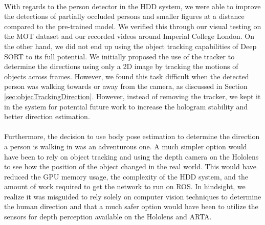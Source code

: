 \paragraph{}With regards to the person detector in the HDD system, we were able to improve the detections of partially occluded persons and smaller figures at a distance compared to the pre-trained model. We verified this through our visual testing on the MOT dataset and our recorded videos around Imperial College London. On the other hand, we did not end up using the object tracking capabilities of Deep SORT to its full potential. We initially proposed the use of the tracker to determine the directions using only a 2D image by tracking the motions of objects across frames. However, we found this task difficult when the detected person was walking towards or away from the camera, as discussed in Section \ref{sec:objecTrackingDirection}. However, instead of removing the tracker, we kept it in the system for potential future work to increase the hologram stability and better direction estimation.

\paragraph{}Furthermore, the decision to use body pose estimation to determine the direction a person is walking in was an adventurous one. A much simpler option would have been to rely on object tracking and using the depth camera on the Hololens to see how the position of the object changed in the real world. This would have reduced the GPU memory usage, the complexity of the HDD system, and the amount of work required to get the network to run on ROS. In hindsight, we realize it was misguided to rely solely on computer vision techniques to determine the human direction and that a much safer option would have been to utilize the sensors for depth perception available on the Hololens and ARTA.

